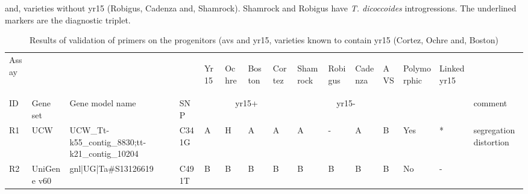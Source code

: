 \begin{sidewaystable}
\caption{Results of validation of primers on the progenitors (\acrshort{avs} and \acrshort{yr15}, varieties known to contain \acrshort{yr15} (Cortez, Ochre and, Boston) } and, varieties without \acrshort{yr15} (Robigus, Cadenza and, Shamrock). Shamrock and Robigus have \textit{T. dicoccoides} introgressions. The underlined markers are the diagnostic triplet. 

\label{tab:yr15:markersToTest}
\begin{localsize}{6}{9}
\centering
\begin{tabular}{llllllll|lllllll}
\toprule
Assay &             &                    &        & \begin{sideways}Yr15\end{sideways}    & \begin{sideways}Ochre\end{sideways}  & \begin{sideways}Boston\end{sideways}    & \begin{sideways}Cortez\end{sideways}    & \begin{sideways}Shamrock \end{sideways}    & \begin{sideways}Robigus\end{sideways}    & \begin{sideways}Cadenza\end{sideways}    & \begin{sideways}AVS\end{sideways} & \begin{sideways}Polymorphic\end{sideways} & \begin{sideways}Linked \acrshort{yr15}\end{sideways}  &\\
 ID   & Gene set    & Gene model name    & SNP    & \multicolumn{4}{c}{\acrshort{yr15}+ } & \multicolumn{4}{c}{\acrshort{yr15}- } &   &      & comment                 \\
\midrule
 R1         & UCW         & UCW\_Tt-k55\_contig\_8830;tt-k21\_contig\_10204                      & C341G  & A      & H         & A        & A        & A            & -         & A         & B     & Yes           & * &   segregation distortion                      \\
 R2         & UniGene v60 & gnl|UG|Ta\#S13126619                                             & C491T  & B      & B         & B        & B        & B            & B         & B         & B     & No            & -                      &                         \\

\end{tabular}
\end{localsize}
\end{sidewaystable}
